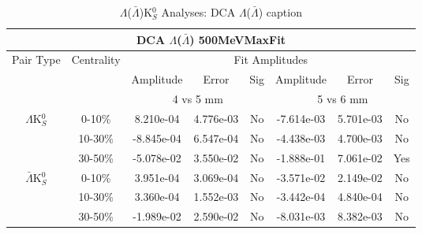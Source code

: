 \documentclass[../AnalysisNoteJBuxton.tex]{subfiles}
\begin{document}
\begin{table}
 \centering
 \begin{tabular}{|c|c|c|c|c||c|c|c|}
  \multicolumn{8}{c}{DCA $\Lambda$($\bar{\Lambda}$) 500MeVMaxFit} \\
  \hline
  \multirow{3}{*}{Pair Type} & \multirow{3}{*}{Centrality} & \multicolumn{6}{c|}{Fit Amplitudes} \\
  \cline{3-8}
   & & Amplitude & Error & Sig & Amplitude & Error & Sig \\
  \cline{3-8}
   & & \multicolumn{3}{c||}{4 vs 5 mm} & \multicolumn{3}{c|}{5 vs 6 mm} \\
  \hline  
  \multirow{3}{*}{$\Lambda$K$^{0}_{S}$}  
   &  0-10\% & 8.210e-04 & 4.776e-03 & No & -7.614e-03 & 5.701e-03 & No \\
   & 10-30\% & -8.845e-04 & 6.547e-04 & No & -4.438e-03 & 4.700e-03 & No \\
   & 30-50\% & -5.078e-02 & 3.550e-02 & No & -1.888e-01 & 7.061e-02 & Yes \\
  \hline  
  \multirow{3}{*}{$\bar{\Lambda}$K$^{0}_{S}$}  
   &  0-10\% & 3.951e-04 & 3.069e-04 & No & -3.571e-02 & 2.149e-02 & No \\
   & 10-30\% & 3.360e-04 & 1.552e-03 & No & -3.442e-04 & 4.840e-04 & No \\
   & 30-50\% & -1.989e-02 & 2.590e-02 & No & -8.031e-03 & 8.382e-03 & No \\
  \hline
 \end{tabular}
 \caption{$\Lambda$($\bar{\Lambda}$)K$^{0}_{S}$ Analyses: DCA $\Lambda$($\bar{\Lambda}$) caption}
 \label{tab:LamDcaLamK0_500MeVMaxFit}
\end{table}
\end{document}
